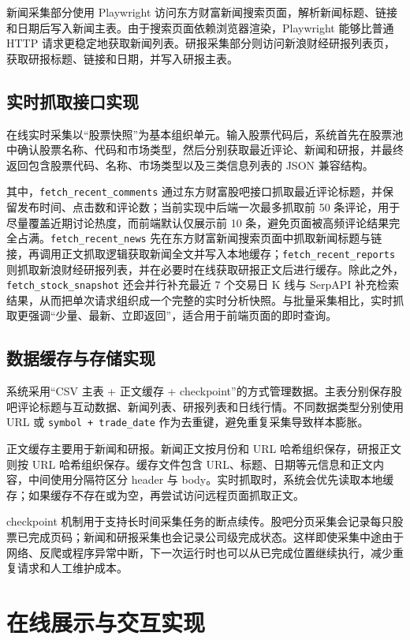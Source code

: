新闻采集部分使用 Playwright 访问东方财富新闻搜索页面，解析新闻标题、链接和日期后写入新闻主表。由于搜索页面依赖浏览器渲染，Playwright 能够比普通 HTTP 请求更稳定地获取新闻列表。研报采集部分则访问新浪财经研报列表页，获取研报标题、链接和日期，并写入研报主表。

\subsection{实时抓取接口实现}

在线实时采集以“股票快照”为基本组织单元。输入股票代码后，系统首先在股票池中确认股票名称、代码和市场类型，然后分别获取最近评论、新闻和研报，并最终返回包含股票代码、名称、市场类型以及三类信息列表的 JSON 兼容结构。

其中，\texttt{fetch\_recent\_comments} 通过东方财富股吧接口抓取最近评论标题，并保留发布时间、点击数和评论数；当前实现中后端一次最多抓取前 50 条评论，用于尽量覆盖近期讨论热度，而前端默认仅展示前 10 条，避免页面被高频评论结果完全占满。\texttt{fetch\_recent\_news} 先在东方财富新闻搜索页面中抓取新闻标题与链接，再调用正文抓取逻辑获取新闻全文并写入本地缓存；\texttt{fetch\_recent\_reports} 则抓取新浪财经研报列表，并在必要时在线获取研报正文后进行缓存。除此之外，\texttt{fetch\_stock\_snapshot} 还会并行补充最近 7 个交易日 K 线与 SerpAPI 补充检索结果，从而把单次请求组织成一个完整的实时分析快照。与批量采集相比，实时抓取更强调“少量、最新、立即返回”，适合用于前端页面的即时查询。

\subsection{数据缓存与存储实现}

系统采用“CSV 主表 + 正文缓存 + checkpoint”的方式管理数据。主表分别保存股吧评论标题与互动数据、新闻列表、研报列表和日线行情。不同数据类型分别使用 URL 或 \texttt{symbol + trade\_date} 作为去重键，避免重复采集导致样本膨胀。

正文缓存主要用于新闻和研报。新闻正文按月份和 URL 哈希组织保存，研报正文则按 URL 哈希组织保存。缓存文件包含 URL、标题、日期等元信息和正文内容，中间使用分隔符区分 header 与 body。实时抓取时，系统会优先读取本地缓存；如果缓存不存在或为空，再尝试访问远程页面抓取正文。

checkpoint 机制用于支持长时间采集任务的断点续传。股吧分页采集会记录每只股票已完成页码；新闻和研报采集也会记录公司级完成状态。这样即使采集中途由于网络、反爬或程序异常中断，下一次运行时也可以从已完成位置继续执行，减少重复请求和人工维护成本。

\section{在线展示与交互实现}

